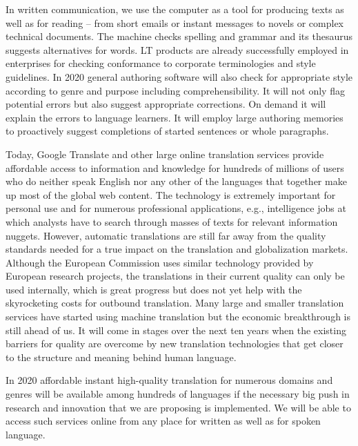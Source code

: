 \begin{multicols}{2}
In written communication, we use the computer as a tool for producing texts as well as for reading – from short emails or instant messages to novels or complex technical documents. The machine checks spelling and grammar and its thesaurus suggests alternatives for words. LT products are already successfully employed in enterprises for checking conformance to corporate terminologies and style guidelines. In 2020 general authoring software will also check for appropriate style according to genre and purpose including comprehensibility. It will not only flag potential errors but also suggest appropriate corrections. On demand it will explain the errors to language learners. It will employ large authoring memories to proactively suggest completions of started sentences or whole paragraphs.
 
Today, Google Translate and other large online translation services provide affordable access to information and knowledge for hundreds of millions of users who do neither speak English nor any other of the languages that together make up most of the global web content. The technology is extremely important for personal use and for numerous professional applications, e.g., intelligence jobs at which analysts have to search through masses of texts for relevant information nuggets. However, automatic translations are still far away from the quality standards needed for a true impact on the translation and globalization markets. Although the European Commission uses similar technology provided by European research projects, the translations in their current quality can only be used internally, which is great progress but does not yet help with the skyrocketing costs for outbound translation. Many large and smaller translation services have started using machine translation but the economic breakthrough is still ahead of us. It will come in stages over the next ten years when the existing barriers for quality are overcome by new translation technologies that get closer to the structure and meaning behind human language.
 
In 2020 affordable instant high-quality translation for numerous domains and genres will be available among hundreds of languages if the necessary big push in research and innovation that we are proposing is implemented. We will be able to access such services online from any place for written as well as for spoken language.
 

\end{multicols}
